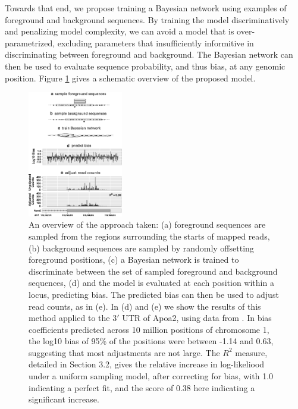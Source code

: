 \documentclass{bioinfo}
\begin{document}
Towards that end, we propose training a Bayesian network using examples of
foreground and background sequences. By training the model discriminatively and
penalizing model complexity, we can avoid a model that is over-parametrized,
excluding parameters that insufficiently informitive in discriminating between
foreground and background. The Bayesian network can then be used to evaluate
sequence probability, and thus bias, at any genomic position. Figure
\ref{fig:overview} gives a schematic overview of the proposed model.

\begin{figure}
\centerline{\includegraphics[width=0.37\textwidth]{overview.eps}}
\caption{An overview of the approach taken: (a) foreground sequences are sampled
from the regions surrounding the starts of mapped reads, (b) background
sequences are sampled by randomly offsetting foreground positions, (c) a
Bayesian network is trained to discriminate between the set of
sampled foreground and background sequences, (d) and the model is evaluated
at each position within a locus, predicting bias. The predicted bias can then be
used to adjust read counts, as in (e). In (d) and (e) we show the results of
this method applied to the $3'$ UTR of Apoa2, using data from
\citet{Mortazavi2008}. In bias coefficients predicted across 10 million positions
of chromosome 1, the log10 bias of 95\% of the positions were between -1.14 and
0.63, suggesting that most adjustments are not large. The $R^2$ measure,
detailed in Section 3.2, gives the relative increase in log-likeliood under a
uniform sampling model, after correcting for bias, with 1.0 indicating a perfect
fit, and the score of 0.38 here indicating a significant increase.
}
\label{fig:overview}
\end{figure}
\end{document}
